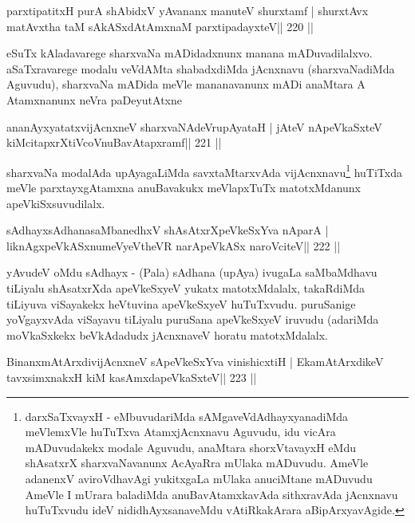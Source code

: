 \begin{shl}
parxtipatitxH purA shAbidxV yAvananx manuteV shurxtamf |
shurxtAvx matAvx\s tha taM sAkASxdAtAmxnaM parxtipadayxteV\hfill || 220 ||
\end{shl}

\begin{artha}
eSuTx kAladavarege sharxvaNa mADidadxnunx manana mADuvadilalxvo. aSaTxravarege modalu veVdAMta shabadxdiMda jAcnxnavu (sharxvaNadiMda Aguvudu), sharxvaNa mADida meVle mananavanunx mADi anaMtara A Atamxnanunx neVra paDeyutAtxne 
\end{artha}

\begin{shl}
ananAyxyatatxvijAcnxneV sharxvaNAdeVrupAyataH |
jAteV nApeVkaSxteV kiMcitapxrXtiVcoV\s nuBavAtapxramf\hfill || 221 ||
\end{shl}

\begin{artha}
sharxvaNa modalAda upAyagaLiMda savxtaMtarxvAda vijAcnxnavu\footnote{darxSaTxvayxH - eMbuvudariMda sAMgaveVdAdhayxyanadiMda meVlemxVle huTuTxva AtamxjAcnxnavu Aguvudu, idu vicAra mADuvudakekx modale Aguvudu, anaMtara shorxVtavayxH eMdu shAsatxrX sharxvaNavanunx AcAyaRra mUlaka mADuvudu. AmeVle adanenxV aviroVdhavAgi yukitxgaLa mUlaka anuciMtane mADuvudu AmeVle I mUrara baladiMda anuBavAtamxkavAda sithxravAda jAcnxnavu huTuTxvudu ideV nididhAyxsanaveMdu vAtiRkakArara aBipArxyavAgide.} huTiTxda meVle parxtayxgAtamxna anuBavakukx meVlapxTuTx matotxMdanunx apeVkiSxsuvudilalx.
\end{artha}

\begin{shl}
sAdhayxsAdhanasaMbanedhxV shAsAtxrXpeVkeSxYva nAparA |
liknAgxpeVkASx\s numeVyeV\s theVR narApeVkASx naroVciteV\hfill || 222 ||
\end{shl}

\begin{artha}
yAvudeV oMdu sAdhayx - (Pala) sAdhana (upAya) ivugaLa saMbaMdhavu tiLiyalu shAsatxrXda apeVkeSxyeV yukatx matotxMdalalx, takaRdiMda tiLiyuva viSayakekx heVtuvina apeVkeSxyeV huTuTxvudu. puruSanige yoVgayxvAda viSayavu tiLiyalu puruSana apeVkeSxyeV iruvudu (adariMda moVkaSxkekx beVkAdadudx jAcnxnaveV horatu matotxMdalalx.
\end{artha}

\begin{shl}
BinanxmAtArxdivijAcnxneV sApeVkeSxYva vinishicxtiH |
EkamAtArxdikeV tavxsimxnakxH kiM kasAmxdapeVkaSxteV\hfill || 223 ||
\end{shl}

